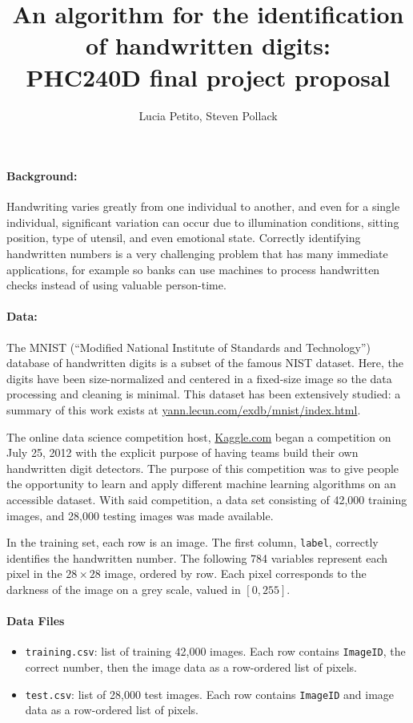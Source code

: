 \documentclass[10pt]{article}
\title{An algorithm for the identification of handwritten digits: \\ PHC240D final project proposal}
\author{Lucia Petito, Steven Pollack}
\date{}
\begin{document}
\maketitle

\paragraph{Background:}
Handwriting varies greatly from one individual to another, and even for a single individual, significant variation can occur due to illumination conditions, sitting position, type of utensil, and even emotional state.  Correctly identifying handwritten numbers is a very challenging problem that has many immediate applications, for example so banks can use machines to process handwritten checks instead of using valuable person-time.  


\paragraph{Data:} The MNIST (``Modified National Institute of Standards and Technology'') database of handwritten digits is a subset of the famous NIST dataset.  Here, the digits have been size-normalized and centered in a fixed-size image so the data processing and cleaning is minimal.  This dataset has been extensively studied: a summary of this work exists at \url{yann.lecun.com/exdb/mnist/index.html}.

The online data science competition host, \url{Kaggle.com} began a competition on July 25, 2012 with the explicit purpose of having teams build their own handwritten digit detectors. The purpose of this competition was to give people the opportunity to learn and apply different machine learning algorithms on an accessible dataset.  With said competition, a data set consisting of 42,000 training images, and 28,000 testing images was made available. 

In the training set, each row is an image.  The first column, \verb|label|, correctly identifies the handwritten number.  The following 784 variables represent each pixel in the $28 \times 28$ image, ordered by row.  Each pixel corresponds to the darkness of the image on a grey scale, valued in $[0, 255]$.  
\paragraph{Data Files}
\begin{itemize}
  \item \texttt{training.csv}: list of training 42,000 images. Each row contains \verb|ImageID|, the correct number, then the image data as a row-ordered list of pixels.
  \item \texttt{test.csv}: list of 28,000 test images. Each row contains \verb|ImageID| and image data as a row-ordered list of pixels.
\end{itemize}
\end{document}
